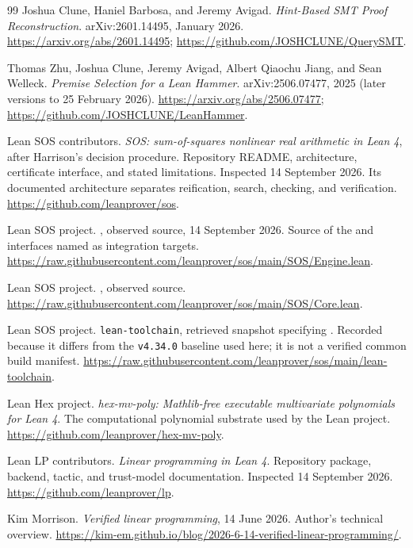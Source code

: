 \begin{thebibliography}{99}
Joshua Clune, Haniel Barbosa, and Jeremy Avigad.
\emph{Hint-Based SMT Proof Reconstruction}. arXiv:2601.14495, January 2026.
\url{https://arxiv.org/abs/2601.14495};
\url{https://github.com/JOSHCLUNE/QuerySMT}.

Thomas Zhu, Joshua Clune, Jeremy Avigad, Albert Qiaochu Jiang, and
Sean Welleck. \emph{Premise Selection for a Lean Hammer}.
arXiv:2506.07477, 2025 (later versions to 25 February 2026).
\url{https://arxiv.org/abs/2506.07477};
\url{https://github.com/JOSHCLUNE/LeanHammer}.

Lean SOS contributors. \emph{SOS: sum-of-squares nonlinear real arithmetic in
Lean 4}, after Harrison's decision procedure. Repository README, architecture,
certificate interface, and stated limitations. Inspected 14 September 2026.
Its documented architecture separates reification, search, checking, and
verification.
\url{https://github.com/leanprover/sos}.

Lean SOS project. , observed  source,
14 September 2026. Source of the  and
 interfaces named as integration targets.
\url{https://raw.githubusercontent.com/leanprover/sos/main/SOS/Engine.lean}.

Lean SOS project. , observed  source.
\url{https://raw.githubusercontent.com/leanprover/sos/main/SOS/Core.lean}.

Lean SOS project. \texttt{lean-toolchain}, retrieved  snapshot
specifying . Recorded because it differs from the
\texttt{v4.34.0} baseline used here; it is not a verified common build
manifest.
\url{https://raw.githubusercontent.com/leanprover/sos/main/lean-toolchain}.

Lean Hex project. \emph{hex-mv-poly: Mathlib-free executable multivariate
polynomials for Lean 4}. The computational polynomial substrate used by the
Lean  project.
\url{https://github.com/leanprover/hex-mv-poly}.

Lean LP contributors. \emph{Linear programming in Lean 4}. Repository package,
backend, tactic, and trust-model documentation. Inspected 14 September 2026.
\url{https://github.com/leanprover/lp}.

Kim Morrison. \emph{Verified linear programming}, 14 June 2026.
Author's technical overview.
\url{https://kim-em.github.io/blog/2026-6-14-verified-linear-programming/}.


\end{thebibliography}
